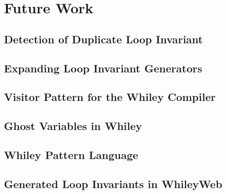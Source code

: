 \chapter{Future Work}\label{C:future}

\section{Detection of Duplicate Loop Invariant}

\section{Expanding Loop Invariant Generators}

\section{Visitor Pattern for the Whiley Compiler}

\section{Ghost Variables in Whiley}

\section{Whiley Pattern Language}

\section{Generated Loop Invariants in WhileyWeb}
